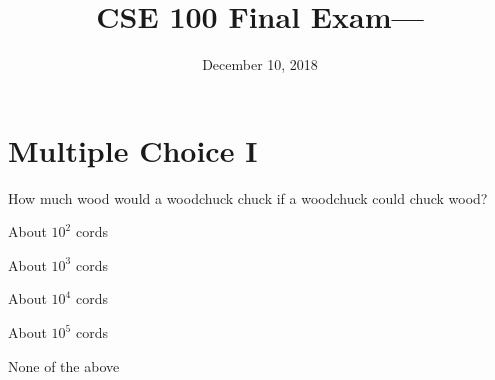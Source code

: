 \documentclass[11pt,nochoiceboxes,solutions,internaltesting]{exam3}
\begin{document}
\title{CSE 100 Final Exam---\fbox{\textbf{\examversionname}}}
\date{December 10, 2018}
\maketitle

\thispagestyle{fancy}
\setlength{\partopsep}{0pt}

\section*{Multiple Choice I}

\begin{problem}{2}
  How much wood would a woodchuck chuck if a woodchuck could chuck wood?
  \begin{multichoice}
    \item *About $10^2$ cords
    \item *About $10^3$ cords
    \item About $10^4$ cords
    \item About $10^5$ cords
    \item None of the above
  \end{multichoice}
\end{problem}
\end{document}

